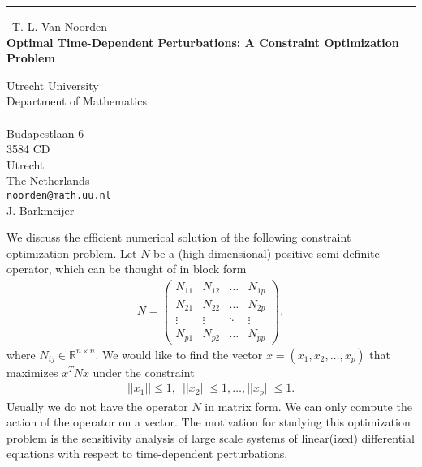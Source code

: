 \documentclass{report}
\begin{document}
\begin{center}
\rule{6in}{1pt} \
{\large T. L. Van Noorden \\
{\bf Optimal Time-Dependent Perturbations: A Constraint Optimization Problem}}

Utrecht University \\ Department of Mathematics \\ \\ Budapestlaan 6 \\ 3584 CD \\ Utrecht \\ The Netherlands
\\
{\tt noorden@math.uu.nl}\\
J. Barkmeijer\end{center}

We discuss the efficient numerical solution of the following
constraint optimization problem.
Let $N$ be a (high dimensional) positive semi-definite operator, which can
be thought of in block form
\begin{eqnarray}
N=\left(\begin{array}{cccc}N_{11}&N_{12}&\hdots&N_{1p}\\
N_{21}&N_{22}&\hdots&N_{2p}\\
\vdots&\vdots&\ddots&\vdots\\
N_{p1}&N_{p2}&\hdots&N_{pp}\end{array}\right),
\end{eqnarray}
where $N_{ij}\in \mathbb{R}^{n\times n}$. We would like to find the vector
$x=(x_1,x_2,\hdots,x_p)$ that maximizes $x^TNx$ under the constraint
\begin{eqnarray}
||x_1||\leq1,\,\,\,||x_2||\leq1,\hdots,||x_p||\leq1.
\end{eqnarray}
Usually we do not have the operator $N$ in matrix form. We can only
compute the action of the operator on a vector.
The motivation for studying this optimization problem is the
sensitivity analysis of large scale
systems of linear(ized) differential equations with respect
to time-dependent perturbations.
\end{document}
